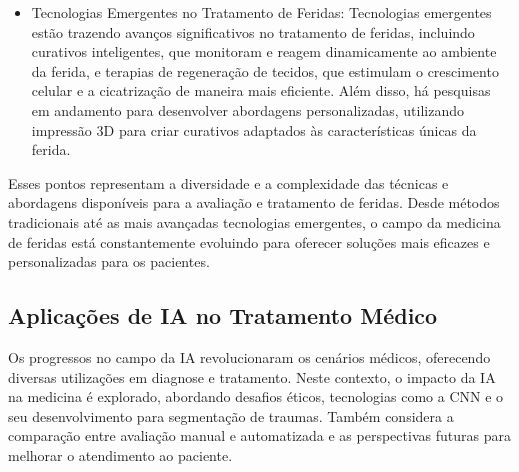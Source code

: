 \begin{itemize}
    \item Tecnologias Emergentes no Tratamento de Feridas: Tecnologias emergentes estão trazendo avanços significativos no tratamento de feridas, incluindo curativos inteligentes, que monitoram e reagem dinamicamente ao ambiente da ferida, e terapias de regeneração de tecidos, que estimulam o crescimento celular e a cicatrização de maneira mais eficiente. Além disso, há pesquisas em andamento para desenvolver abordagens personalizadas, utilizando impressão 3D para criar curativos adaptados às características únicas da ferida.
    
\end{itemize}

    Esses pontos representam a diversidade e a complexidade das técnicas e abordagens disponíveis para a avaliação e tratamento de feridas. Desde métodos tradicionais até as mais avançadas tecnologias emergentes, o campo da medicina de feridas está constantemente evoluindo para oferecer soluções mais eficazes e personalizadas para os pacientes.

\subsection{Aplicações de IA no Tratamento Médico}

Os progressos no campo da \ac{IA} revolucionaram os cenários médicos, oferecendo diversas utilizações em diagnose e tratamento. Neste contexto, o impacto da \ac{IA} na medicina é explorado, abordando desafios éticos, tecnologias como a \ac{CNN} e o seu desenvolvimento para segmentação de traumas. Também considera a comparação entre avaliação manual e automatizada e as perspectivas futuras para melhorar o atendimento ao paciente. \cite{wang2018interactive}

